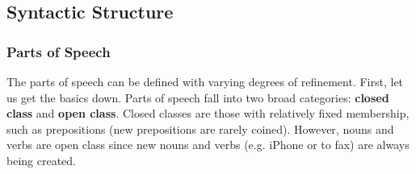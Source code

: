 \documentclass{article}
\begin{document}
  \subsection{Syntactic Structure}

    \subsubsection{Parts of Speech}

      The parts of speech can be defined with varying degrees of refinement. First, let us get the basics down. Parts of speech fall into two broad categories: \textbf{closed class} and \textbf{open class}. Closed classes are those with relatively fixed membership, such as prepositions (new prepositions are rarely coined). However, nouns and verbs are open class since new nouns and verbs (e.g. iPhone or to fax) are always being created. 
\end{document}
